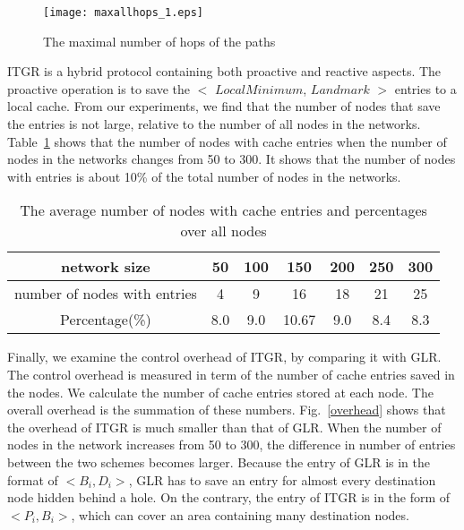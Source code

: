 \documentclass[3p,times]{elsarticle}
\begin{document}
\begin{figure}[!htp]
\begin{center}
\texttt{[image: maxallhops\_1.eps]}
\end{center}
\caption{The maximal number of hops of the paths}
\label{fig22}
\end{figure}



ITGR is a hybrid protocol containing both proactive and reactive aspects. The proactive
operation is to save the $<$ $LocalMinimum$, $Landmark$ $>$ entries to
a local cache.
From our experiments, we find that the number of nodes that save the entries is not large,
relative to the number of all nodes in the networks.
Table~\ref{table3} shows that the number of nodes with cache entries
when the number of nodes in the networks changes
from 50 to 300. It  shows that the number of nodes with entries is about 10\%
of the total number of nodes in the networks.

\begin{table}[ht]
\caption{The average  number of nodes with cache entries and percentages over all nodes}
\centering          \begin{tabular}{c c c c c c c}    \hline\hline                        network size & 50 & 100 & 150 & 200 & 250 & 300 \\ [0.5ex]  \hline                      number of nodes with entries &4&9&16&18&21&25 \\      Percentage(\%)   &8.0&9.0&10.67&9.0&8.4&8.3\\  [1ex]        \hline          \end{tabular}
\label{table3}    \end{table}





Finally, we examine the control overhead of ITGR, by comparing it with GLR.
The control overhead is measured in term of the number of cache
entries saved in the nodes.
We calculate the number of cache entries stored at each node. The
overall overhead is the summation of these numbers.
Fig.~\ref{overhead}
shows
that the overhead of ITGR is much smaller than that of GLR.
When the number of nodes in the network increases from 50 to 300, the difference
in number of entries between the
two schemes becomes larger.
Because the entry of GLR is in the format of $<B_i, D_i>$,
GLR has to save an entry for
almost every destination node hidden behind a hole.
On the contrary, the entry of ITGR is in the form of $<P_i, B_i>$,
which can cover an area containing many destination nodes.
\end{document}

